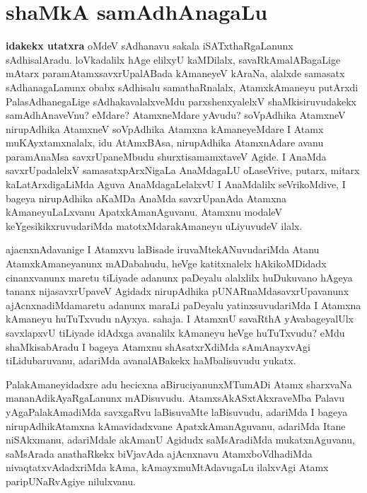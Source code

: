 \section*{shaMkA samAdhAnagaLu} 

\begin{artha}
\textbf{idakekx utatxra} oMdeV sAdhanavu sakala iSATxthaRgaLanunx sAdhisalAradu. loVkadalilx hAge elilxyU kaMDilalx, savaRkAmalABagaLige mAtarx paramAtamxsavxrUpalABada kAmaneyeV kAraNa, alalxde samasatx sAdhanagaLanunx obabx sAdhisalu samathaRnalalx, AtamxkAmaneyu putArxdi PalasAdhanegaLige sAdhakavalalxveMdu parxshenxyalelxV shaMkisiruvudakekx samAdhAnaveVnu? eMdare? AtamxneMdare yAvudu? soVpAdhika AtamxneV nirupAdhika AtamxneV soVpAdhika Atamxna kAmaneyeMdare I Atamx muKAyxtamxnalalx, idu AtAmxBAsa, nirupAdhika AtamxnAdare avanu paramAnaMsa savxrUpaneMbudu shurxtisamamxtaveV Agide. I AnaMda savxrUpadalelxV samasatxpArxNigaLa AnaMdagaLU oLaseVrive, putarx, mitarx kaLatArxdigaLiMda Aguva AnaMdagaLelalxvU I AnaMdalilx seVrikoMdive, I bageya nirupAdhika aKaMDa AnaMda savxrUpanAda Atamxna kAmaneyuLaLxvanu ApatxkAmanAguvanu. Atamxnu modaleV keYgesikikxruvudariMda matotxMdarakAmaneyu uLiyuvudeV ilalx.
\end{artha}



\begin{artha}
ajacnxnAdavanige I Atamxvu laBisade iruvaMtekANuvudariMda Atanu AtamxkAmaneyanunx mADabahudu, heVge katitxnalelx hAkikoMDidadx cinanxvanunx maretu tiLiyade adanunx paDeyalu alalxlilx huDukuvano hAgeya tananx nijasavxrUpaveV Agidadx nirupAdhika pUNARnaMda\-\break savxrUpavanunx ajAcnxnadiMdamaretu adanunx maraLi paDeyalu yatinxsuvudariMda I Atamxna kAmaneyu huTuTxvudu nAyxya. sahaja. I AtamxnU savaRthA yAvabageyalUlx savxlapxvU tiLiyade idAdxga avanalilx kAmaneyu heVge huTuTxvudu? eMdu shaMkisabAradu I bageya Atamxnu shAsatxrXdiMda sAmAnayxvAgi tiLidubaruvanu, adariMda avanalABakekx haMbalisuvudu yukatx. 

PalakAmaneyidadxre adu hecicxna aBiruciyanunxMTumADi Atamx sharxvaNa mananAdikAyaRgaLanunx mADisuvudu. AtamxsAkASxtAkxraveMba Palavu yAgaPalakAmadiMda savxgaRvu laBisuvaMte laBisuvudu, adariMda I bageya nirupAdhikAtamxna kAmavidadxvane ApatxkAmanAguvanu, adariMda Itane niSAkxmanu, adariMdale akAmanU Agidudx saMsAradiMda mukatxnAguvanu, saMsArada anathaRkekx biVjavAda ajAcnxnavu AtamxboVdhadiMda nivaqtatxvAdadxriMda kAma, kAmayx\break muMtAdavugaLu ilalxvAgi Atamx paripUNaRvAgiye nilulxvanu.
\end{artha}

